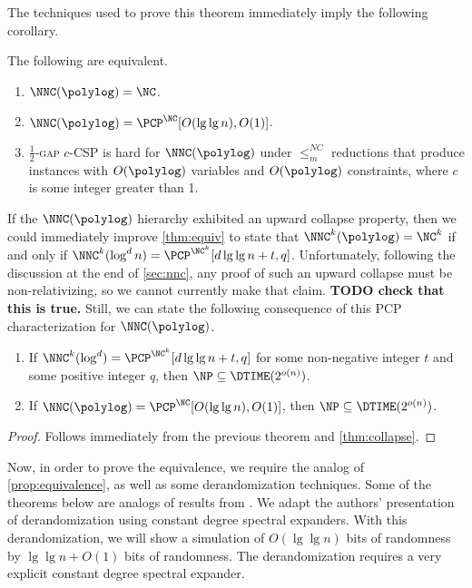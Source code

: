 \documentclass[]{article}
\begin{document}
The techniques used to prove this theorem immediately imply the following corollary.

\begin{corollary}
  The following are equivalent.
  \begin{enumerate}
  \item $\NNC(\polylog) = \NC$.
  \item $\NNC(\polylog) = \PCP^{\NC}[O(\lg \lg n), O(1)]$.
  \item \textsc{$\frac{1}{2}$-gap $c$-CSP} is hard for $\NNC(\polylog)$ under $\leq_m^{NC}$ reductions that produce instances with $O(\polylog)$ variables and $O(\polylog)$ constraints, where $c$ is some integer greater than 1.
  \end{enumerate}
\end{corollary}

If the $\NNC(\polylog)$ hierarchy exhibited an upward collapse property, then we could immediately improve \autoref{thm:equiv} to state that $\NNC^k(\polylog) = \NC^k$ if and only if $\NNC^k(\log^d n) = \PCP^{\NC^k}[d \lg \lg n + t, q]$.
Unfortunately, following the discussion at the end of \autoref{sec:nnc}, any proof of such an upward collapse must be non-relativizing, so we cannot currently make that claim.
\textbf{TODO check that this is true.}
Still, we can state the following consequence of this PCP characterization for $\NNC(\polylog)$.
\begin{corollary}
  \mbox{}
  \begin{enumerate}
  \item If $\NNC^k(\log^d) = \PCP^{\NC^k}[d \lg \lg n + t, q]$ for some non-negative integer $t$ and some positive integer $q$, then $\NP \subseteq \DTIME(2^{o(n)})$.
  \item If $\NNC(\polylog) = \PCP^{\NC}[O(\lg \lg n), O(1)]$, then $\NP \subseteq \DTIME(2^{o(n)})$.
  \end{enumerate}
\end{corollary}
\begin{proof}
  Follows immediately from the previous theorem and \autoref{thm:collapse}.
\end{proof}

Now, in order to prove the equivalence, we require the \NC{} analog of \autoref{prop:equivalence}, as well as some derandomization techniques.
Some of the theorems below are \NC{} analogs of results from \cite{fs96}.
We adapt the authors' presentation of derandomization using constant degree spectral expanders.
With this derandomization, we will show a simulation of $O(\lg \lg n)$ bits of randomness by $\lg \lg n + O(1)$ bits of randomness.
The derandomization requires a very explicit constant degree spectral expander.
\end{document}
